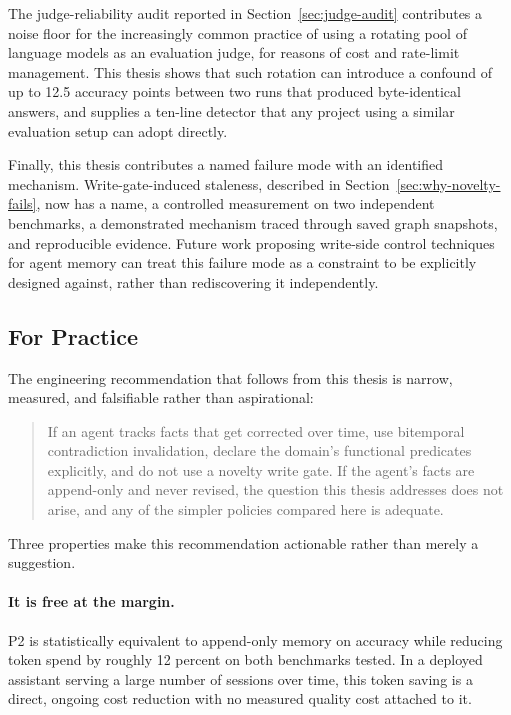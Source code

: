 The judge-reliability audit reported in Section~\ref{sec:judge-audit} contributes a noise floor for the increasingly common practice of using a rotating pool of language models as an evaluation judge, for reasons of cost and rate-limit management. This thesis shows that such rotation can introduce a confound of up to 12.5 accuracy points between two runs that produced byte-identical answers, and supplies a ten-line detector that any project using a similar evaluation setup can adopt directly.

Finally, this thesis contributes a named failure mode with an identified mechanism. Write-gate-induced staleness, described in Section~\ref{sec:why-novelty-fails}, now has a name, a controlled measurement on two independent benchmarks, a demonstrated mechanism traced through saved graph snapshots, and reproducible evidence. Future work proposing write-side control techniques for agent memory can treat this failure mode as a constraint to be explicitly designed against, rather than rediscovering it independently.

\subsection{For Practice}
\label{sec:impact-practice}

The engineering recommendation that follows from this thesis is narrow, measured, and falsifiable rather than aspirational:

\begin{quote}
If an agent tracks facts that get corrected over time, use bitemporal contradiction invalidation, declare the domain's functional predicates explicitly, and do not use a novelty write gate. If the agent's facts are append-only and never revised, the question this thesis addresses does not arise, and any of the simpler policies compared here is adequate.
\end{quote}

Three properties make this recommendation actionable rather than merely a suggestion.

\paragraph{It is free at the margin.} P2 is statistically equivalent to append-only memory on accuracy while reducing token spend by roughly 12 percent on both benchmarks tested. In a deployed assistant serving a large number of sessions over time, this token saving is a direct, ongoing cost reduction with no measured quality cost attached to it.

